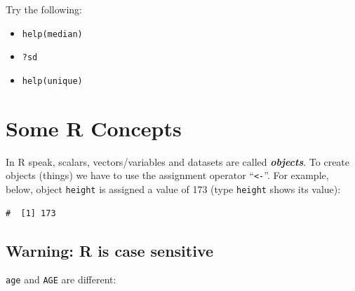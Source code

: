 \documentclass[a4paper,9pt,twocolumn,twoside,printwatermark=false]{pinp}
\providecommand{\tightlist}{%
  \setlength{\itemsep}{0pt}\setlength{\parskip}{0pt}}
\begin{document}
Try the following:

\begin{itemize}
\tightlist
\item
  \texttt{help(median)}
\item
  \texttt{?sd}
\item
  \texttt{help(unique)}
\end{itemize}

\section{Some R Concepts}\label{some-r-concepts}

In R speak, scalars, vectors/variables and datasets are called
\textbf{\emph{objects}}. To create objects (things) we have to use the
assignment operator ``\texttt{\textless{}-}''. For example, below,
object \texttt{height} is assigned a value of 173 (type \texttt{height}
shows its value):

\begin{Shaded}
\begin{Highlighting}[]
\StringTok{ }
\end{Highlighting}
\end{Shaded}

\begin{ShadedResult}
\begin{verbatim}
#  [1] 173
\end{verbatim}
\end{ShadedResult}

\subsection{Warning: R is case
sensitive}\label{warning-r-is-case-sensitive}

\texttt{age} and \texttt{AGE} are different:

\begin{Shaded}
\begin{Highlighting}[]
\StringTok{ }
\StringTok{ }
\end{Highlighting}
\end{Shaded}

\begin{Shaded}
\begin{Highlighting}[]
\end{Highlighting}
\end{Shaded}
\end{document}
